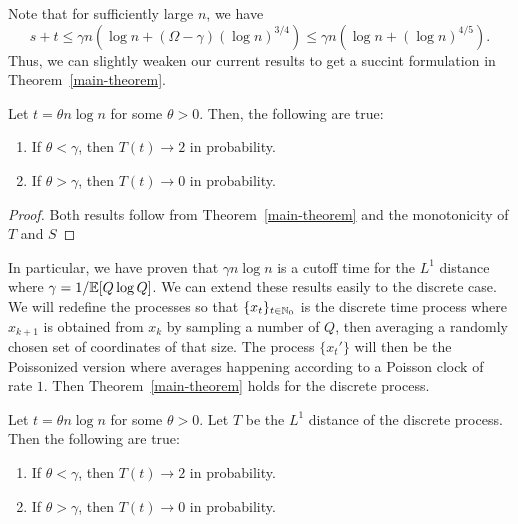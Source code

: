 \documentclass[12pt]{article}
\begin{document}
Note that for sufficiently large $n$, we have 
\[
	s + t \leq \gamma n \left (\log n + (\Omega - \gamma) (\log n)^{3/4} \right ) \leq \gamma n ( \log n + (\log n)^{4/5}).
\]
Thus, we can slightly weaken our current results to get a succint formulation in Theorem~\ref{main-theorem}. 

\begin{thm} \label{main-theorem}
	Let $t = \theta n \log n$ for some $\theta > 0$. Then, the following are true:
	\begin{enumerate}[label = (\alph*)]
		\item If $\theta < \gamma$, then $T(t) \to 2$ in probability. 
		\item If $\theta > \gamma$, then $T(t) \to 0$ in probability. 
	\end{enumerate}
\end{thm}

\begin{proof}
	Both results follow from Theorem~\ref{main-theorem} and the monotonicity of $T$ and $S$
\end{proof}

In particular, we have proven that $\gamma n \log n$ is a cutoff time for the $L^1$ distance where $\gamma = 1/\mathbb{E}[Q \log Q]$. We can extend these results easily to the discrete case. We will redefine the processes so that $\{x_t\}_{t \in \mathbb{N}_0}$ is the discrete time process where $x_{k+1}$ is obtained from $x_k$ by sampling a number of $Q$, then averaging a randomly chosen set of coordinates of that size. The process $\{x_t'\}$ will then be the Poissonized version where averages happening according to a Poisson clock of rate $1$. Then Theorem~\ref{main-theorem} holds for the discrete process. 

\begin{thm} \label{main-theorem-discrete}
	Let $t = \theta n \log n$ for some $\theta > 0$. Let $T$ be the $L^1$ distance of the discrete process. Then the following are true:
	\begin{enumerate}[label = (\alph*)]
		\item If $\theta < \gamma$, then $T(t) \to 2$ in probability. 
		\item If $\theta > \gamma$, then $T(t) \to 0$ in probability. 
	\end{enumerate}
\end{thm}
\end{document}
